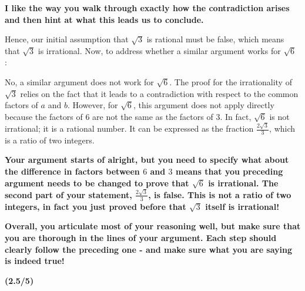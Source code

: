 \documentclass{report}
\begin{document}
\textbf{
I like the way you walk through exactly how the contradiction arises and then hint at what this leads us to conclude.
}

Hence, our initial assumption that $\sqrt{3}$ is rational must be false, which means that $\sqrt{3}$ is irrational. Now, to address whether a similar argument works for $\sqrt{6}$ :

No, a similar argument does not work for $\sqrt{6}$. The proof for the irrationality of $\sqrt{3}$ relies on the fact that it leads to a contradiction with respect to the common factors of $a$ and $b$. However, for $\sqrt{6}$, this argument does not apply directly because the factors of 6 are not the same as the factors of 3. In fact, $\sqrt{6}$ is not irrational; it is a rational number. It can be expressed as the fraction $\frac{2 \sqrt{3}}{3}$, which is a ratio of two integers.

\textbf{
  Your argument starts of alright, but you need to specify what about the difference in factors between $6$ and $3$ means that you preceding argument needs to be changed to prove that $\sqrt{6}$ is irrational. The second part of your statement, $\frac{2\sqrt{3}}{3}$, is false. This is not a ratio of two integers, in fact you just proved before that $\sqrt{3}$ itself is irrational!  
}\par
\textbf{ 
Overall, you articulate most of your reasoning well, but make sure that you are thorough in the lines of your argument. Each step should clearly follow the preceding one - and make sure what you are saying is indeed true!
}\par\textbf{(2.5/5)}
\end{document}
